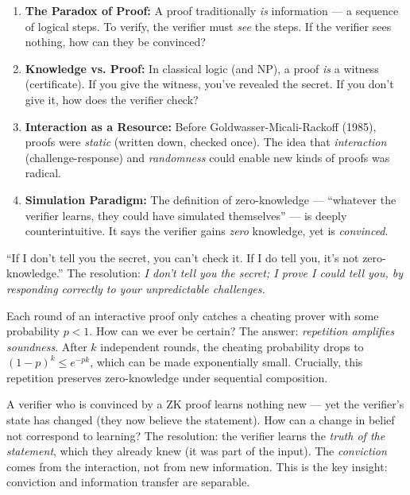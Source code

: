 \begin{enumerate}
\item \textbf{The Paradox of Proof:} A proof traditionally \emph{is} information --- a sequence of logical steps. To verify, the verifier must \emph{see} the steps. If the verifier sees nothing, how can they be convinced?

\item \textbf{Knowledge vs. Proof:} In classical logic (and NP), a proof \emph{is} a witness (certificate). If you give the witness, you've revealed the secret. If you don't give it, how does the verifier check?

\item \textbf{Interaction as a Resource:} Before Goldwasser-Micali-Rackoff (1985), proofs were \emph{static} (written down, checked once). The idea that \emph{interaction} (challenge-response) and \emph{randomness} could enable new kinds of proofs was radical.

\item \textbf{Simulation Paradigm:} The definition of zero-knowledge --- ``whatever the verifier learns, they could have simulated themselves'' --- is deeply counterintuitive. It says the verifier gains \emph{zero} knowledge, yet is \emph{convinced}.
\end{enumerate}

``If I don't tell you the secret, you can't check it. If I do tell you, it's not zero-knowledge.'' The resolution: \emph{I don't tell you the secret; I prove I \emph{could} tell you, by responding correctly to your unpredictable challenges.}

Each round of an interactive proof only catches a cheating prover with some probability $p < 1$. How can we ever be certain? The answer: \emph{repetition amplifies soundness}. After $k$ independent rounds, the cheating probability drops to $(1-p)^k \le e^{-pk}$, which can be made exponentially small. Crucially, this repetition preserves zero-knowledge under sequential composition.

A verifier who is convinced by a ZK proof learns nothing new --- yet the verifier's state has changed (they now believe the statement). How can a change in belief not correspond to learning? The resolution: the verifier learns the \emph{truth of the statement}, which they already knew (it was part of the input). The \emph{conviction} comes from the interaction, not from new information. This is the key insight: conviction and information transfer are separable.


